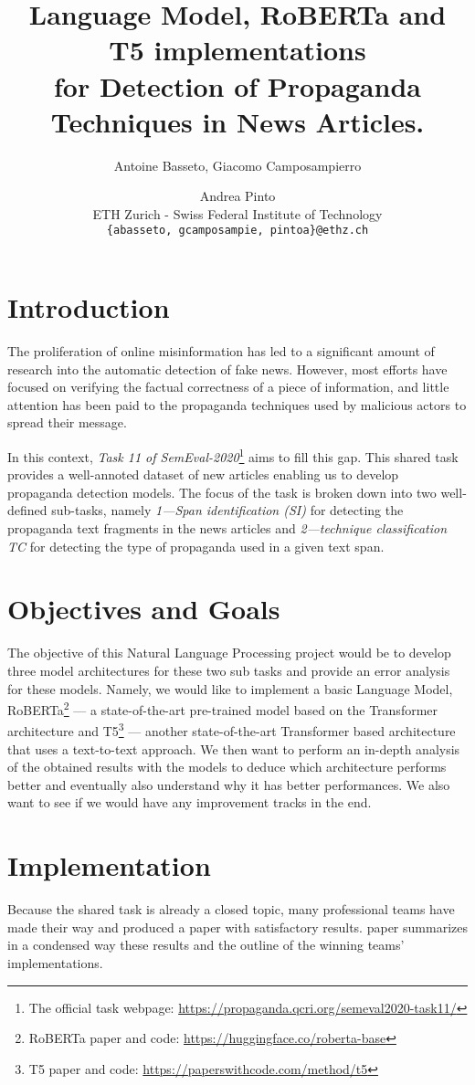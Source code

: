 \documentclass[11pt]{article}
\title{
Language Model, RoBERTa and T5 implementations \\ for Detection of Propaganda Techniques in News Articles.
}
\author{
Antoine Basseto,
Giacomo Camposampierro 
\and Andrea Pinto \\         
ETH Zurich - Swiss Federal Institute of Technology \\ \texttt{\{abasseto, gcamposampie, pintoa\}@ethz.ch}
}
\begin{document}
\maketitle

\section{Introduction}
The proliferation of online misinformation has led to a significant amount of research into the automatic detection of fake news.
However, most efforts have focused on verifying the factual correctness of a piece of information, and little attention has been paid to the propaganda techniques used by malicious actors to spread their message.

In this context, \textit{Task 11 of SemEval-2020}\footnote{The official task webpage: \url{https://propaganda.qcri.org/semeval2020-task11/}} aims to fill this gap.
This shared task provides a well-annoted dataset of new articles enabling us to develop propaganda detection models.
The focus of the task is broken down into two well-defined sub-tasks, namely \textit{1—Span identification (SI)} for detecting the propaganda text fragments in the news articles and \textit{2—technique classification TC} for detecting the type of propaganda used in a given text span.

\section{Objectives and Goals}
The objective of this Natural Language Processing project would be to develop three model architectures for these two sub tasks and provide an error analysis for these models.
Namely, we would like to implement a basic Language Model, RoBERTa\footnote{RoBERTa paper and code: \url{https://huggingface.co/roberta-base}} — a state-of-the-art pre-trained model based on the Transformer architecture and T5\footnote{T5 paper and code: \url{https://paperswithcode.com/method/t5}} — another state-of-the-art Transformer based architecture that uses a text-to-text approach.
We then want to perform an in-depth analysis of the obtained results with the models to deduce which architecture performs better and eventually also understand why it has better performances. We also want to see if we would have any improvement tracks in the end.

\section{Implementation}
Because the shared task is already a closed topic, many professional teams have made their way and produced a paper with satisfactory results. \citet{semeval} paper summarizes in a condensed way these results and the outline of the winning teams' implementations.
\end{document}
